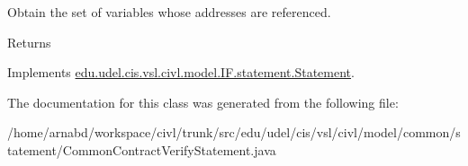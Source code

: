 Obtain the set of variables whose addresses are referenced. 

\begin{DoxyReturn}{Returns}

\end{DoxyReturn}


Implements \hyperlink{interfaceedu_1_1udel_1_1cis_1_1vsl_1_1civl_1_1model_1_1IF_1_1statement_1_1Statement_abe668e1bcb4297c9e6e7f8f65aeecfc2}{edu.\+udel.\+cis.\+vsl.\+civl.\+model.\+I\+F.\+statement.\+Statement}.



The documentation for this class was generated from the following file\+:\begin{DoxyCompactItemize}
\item 
/home/arnabd/workspace/civl/trunk/src/edu/udel/cis/vsl/civl/model/common/statement/Common\+Contract\+Verify\+Statement.\+java\end{DoxyCompactItemize}
